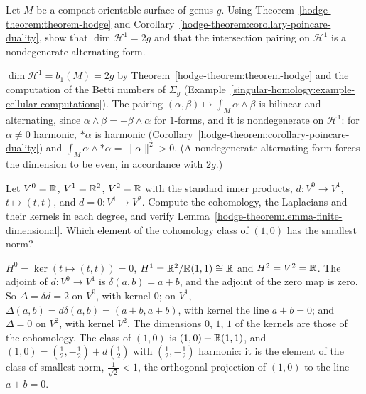 \begin{exercise}\label{hodge-theorem:exercise-hodge-riemann-surface}
Let $M$ be a compact orientable surface of genus $g$. Using Theorem~\ref{hodge-theorem:theorem-hodge} and
Corollary~\ref{hodge-theorem:corollary-poincare-duality}, show that $\dim\mathcal{H}^1 = 2g$ and that the intersection pairing on $\mathcal{H}^1$ is a nondegenerate alternating form.
\end{exercise}

\begin{solution}
$\dim\mathcal{H}^1 = b_1(M) = 2g$ by Theorem~\ref{hodge-theorem:theorem-hodge} and the computation of the Betti numbers of $\Sigma_g$ (Example~\ref{singular-homology:example-cellular-computations}). The pairing
$(\alpha, \beta) \mapsto \int_M\alpha \wedge \beta$ is bilinear and alternating, since $\alpha \wedge \beta = -\beta \wedge \alpha$ for $1$-forms, and it is nondegenerate on $\mathcal{H}^1$: for $\alpha \neq 0$
harmonic, $*\alpha$ is harmonic (Corollary~\ref{hodge-theorem:corollary-poincare-duality}) and $\int_M\alpha \wedge *\alpha = \|\alpha\|^2 > 0$. (A nondegenerate alternating form forces the dimension to be even,
in accordance with $2g$.)
\end{solution}

\begin{exercise}\label{hodge-theorem:exercise-finite-dimensional}
Let $V^0 = \mathbb{R}$, $V^1 = \mathbb{R}^2$, $V^2 = \mathbb{R}$ with the standard inner products, $d \colon V^0 \to V^1$, $t \mapsto (t, t)$, and $d = 0 \colon V^1 \to V^2$. Compute the cohomology, the
Laplacians and their kernels in each degree, and verify Lemma~\ref{hodge-theorem:lemma-finite-dimensional}. Which element of the cohomology class of $(1, 0)$ has the smallest norm?
\end{exercise}

\begin{solution}
$H^0 = \ker(t \mapsto (t, t)) = 0$, $H^1 = \mathbb{R}^2/\mathbb{R}(1, 1) \cong \mathbb{R}$ and $H^2 = V^2 = \mathbb{R}$. The adjoint of $d \colon V^0 \to V^1$ is $\delta(a, b) = a + b$, and the
adjoint of the zero map is zero. So $\Delta = \delta d = 2$ on $V^0$, with kernel $0$; on $V^1$, $\Delta(a, b) = d\delta(a, b) = (a + b, a + b)$, with kernel the line $a + b = 0$; and $\Delta = 0$ on $V^2$, with kernel
$V^2$. The dimensions $0$, $1$, $1$ of the kernels are those of the cohomology. The class of $(1, 0)$ is $(1, 0) + \mathbb{R}(1, 1)$, and $(1, 0) = (\frac12, -\frac12) + d(\frac12)$ with $(\frac12, -\frac12)$ harmonic: it
is the element of the class of smallest norm, $\frac{1}{\sqrt2} < 1$, the orthogonal projection of $(1, 0)$ to the line $a + b = 0$.
\end{solution}

